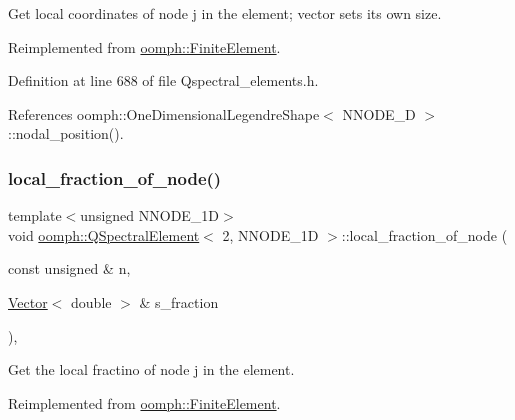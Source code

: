 Get local coordinates of node j in the element; vector sets its own size. 



Reimplemented from \hyperlink{classoomph_1_1FiniteElement_a22bc4ee35e4f948d8d7fba18c7b4f4c4}{oomph\+::\+Finite\+Element}.



Definition at line 688 of file Qspectral\+\_\+elements.\+h.



References oomph\+::\+One\+Dimensional\+Legendre\+Shape$<$ N\+N\+O\+D\+E\+\_\+D $>$\+::nodal\+\_\+position().

\mbox{\label{classoomph_1_1QSpectralElement_3_012_00_01NNODE__1D_01_4_aad06cfe276bda12aa7751b8ea6f185ba}} 
\subsubsection{\texorpdfstring{local\+\_\+fraction\+\_\+of\+\_\+node()}{local\_fraction\_of\_node()}}
{\footnotesize\ttfamily template$<$unsigned N\+N\+O\+D\+E\+\_\+1D$>$ \\
void \hyperlink{classoomph_1_1QSpectralElement}{oomph\+::\+Q\+Spectral\+Element}$<$ 2, N\+N\+O\+D\+E\+\_\+1D $>$\+::local\+\_\+fraction\+\_\+of\+\_\+node (\begin{DoxyParamCaption}\item[{const unsigned \&}]{n,  }\item[{\hyperlink{classoomph_1_1Vector}{Vector}$<$ double $>$ \&}]{s\+\_\+fraction }\end{DoxyParamCaption})\hspace{0.3cm}{\ttfamily [inline]}, {\ttfamily [virtual]}}



Get the local fractino of node j in the element. 



Reimplemented from \hyperlink{classoomph_1_1FiniteElement_a41640b9a9e5f6461cd8ebb8218502b07}{oomph\+::\+Finite\+Element}.



